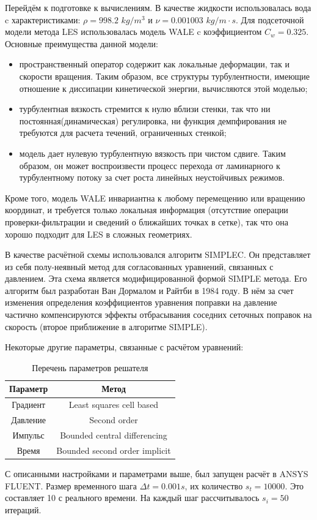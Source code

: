 	Перейдём к подготовке к вычислениям. В качестве жидкости использовалась вода c характеристиками: $\rho = 998.2$ $kg/m^3$ и $\nu = 0.001003$ $kg/m\cdot s$. Для подсеточной модели метода LES использовалась модель WALE c коэффициентом $C_w = 0.325$. Основные преимущества данной модели:
	\begin{itemize}
		\item пространственный оператор содержит как локальные деформации, так и скорости вращения. Таким образом, все структуры турбулентности, имеющие отношение к диссипации кинетической энергии, вычисляются этой моделью;
		\item турбулентная вязкость стремится к нулю вблизи стенки, так что ни постоянная(динамическая) регулировка, ни функция демпфирования не требуются для расчета течений, ограниченных стенкой;
		\item модель дает нулевую турбулентную вязкость при чистом сдвиге. Таким образом, он может воспроизвести процесс перехода от ламинарного к турбулентному потоку за счет роста линейных неустойчивых режимов. 
	\end{itemize}
	Кроме того, модель WALE инвариантна к любому перемещению или вращению координат, и требуется только локальная информация (отсутствие операции проверки-фильтрации и сведений о ближайших точках в сетке), так что она хорошо подходит для LES в сложных геометриях\cite{Nicoud1999}.
	
	В качестве расчётной схемы использовался алгоритм SIMPLEC. Он представляет из себя полу-неявный метод для согласованных уравнений, связанных с давлением. Эта схема является модифицированной формой SIMPLE метода. Его алгоритм был разработан Ван Дормалом и Райтби в 1984 году. В нём за счет изменения определения коэффициентов уравнения поправки на давление частично компенсируются эффекты отбрасывания соседних сеточных поправок на скорость (второе приближение в алгоритме SIMPLE)\cite{Sun2008}.
	
	Некоторые другие параметры, связанные с расчётом уравнений:
	\begin{table}[H]
		\begin{center}
			\begin{tabular}{|c|c|}
				\hline
				Параметр & Метод\\
				\hline
				Градиент & Least squares cell based\\
				\hline
				Давление & Second order\\
				\hline
				Импульс & Bounded central differencing\\
				\hline
				Время & Bounded second order implicit\\
				\hline
			\end{tabular}
		\end{center}
		\caption{Перечень параметров решателя}
	\end{table}
	
	С описанными настройками и параметрами выше, был запущен расчёт в ANSYS FLUENT. Размер временного шага $\Delta t = 0.001 s$, их количество $s_t = 10000$. Это составляет 10 с реального времени. На каждый шаг рассчитывалось $s_i = 50$ итераций.
